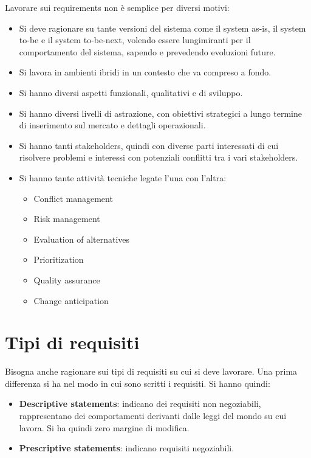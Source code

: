 Lavorare sui requirements non è semplice per diversi motivi:
\begin{itemize}
      \item Si deve ragionare su tante versioni del sistema come il system as-is,
            il system to-be e il system to-be-next, volendo essere lungimiranti per il
            comportamento del sistema, sapendo e prevedendo evoluzioni future.
      \item Si lavora in ambienti ibridi in un contesto che va compreso a fondo.
      \item Si hanno diversi aspetti funzionali, qualitativi e di sviluppo.
      \item Si hanno diversi livelli di astrazione, con obiettivi strategici a
            lungo termine di inserimento sul mercato e dettagli operazionali.
      \item Si hanno tanti stakeholders, quindi con diverse parti interessati di
            cui risolvere problemi e interessi con potenziali conflitti tra i vari
            stakeholders.
      \item Si hanno tante attività tecniche legate l'una con l'altra:
            \begin{itemize}
                  \item Conflict management
                  \item Risk management
                  \item Evaluation of alternatives
                  \item Prioritization
                  \item Quality assurance
                  \item Change anticipation
            \end{itemize}
\end{itemize}
\section{Tipi di requisiti}
Bisogna anche ragionare sui tipi di requisiti su cui si deve lavorare. Una prima
differenza si ha nel modo in cui sono scritti i requisiti. Si hanno quindi:
\begin{itemize}
      \item \textbf{Descriptive statements}: indicano dei requisiti non negoziabili,
            rappresentano dei comportamenti derivanti dalle leggi del mondo su cui
            lavora. Si ha quindi zero margine di modifica.
      \item \textbf{Prescriptive statements}: indicano requisiti negoziabili.
\end{itemize}

